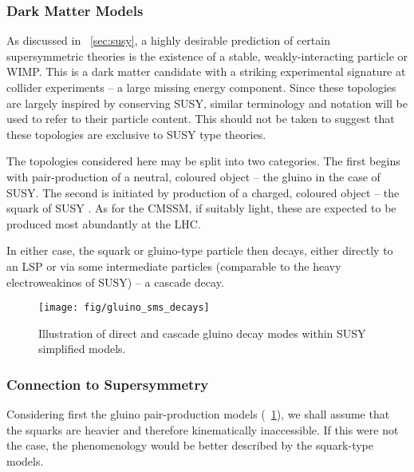 \subsubsection{Dark Matter Models}
As discussed in \chap~\ref{sec:susy}, a highly desirable prediction of certain
supersymmetric theories is the existence of a stable, weakly-interacting
particle or \ac{WIMP}. This is a dark matter candidate with a striking
experimental signature at collider experiments -- a large missing energy
component. Since these topologies are largely inspired by \Rparity conserving
\ac{SUSY}, similar terminology and notation will be used to refer to their
particle content. This should not be taken to suggest that these topologies are
exclusive to \ac{SUSY} type theories.

The topologies considered here may be split into two categories. The first
begins with pair-production of a neutral, coloured object -- the gluino in the
case of \ac{SUSY}. The second is initiated by production of a charged, coloured
object -- the squark of \ac{SUSY} . As for the \ac{CMSSM}, if suitably light,
these are expected to be produced most abundantly at the \ac{LHC}.

In either case, the squark or gluino-type particle then decays, either directly
to an \ac{LSP} or via some intermediate particles (comparable to the heavy
electroweakinos of \ac{SUSY}) -- a cascade decay.

\begin{figure}[htbp!]
\texttt{[image: fig/gluino\_sms\_decays]}
\caption[Illustration of direct and cascade decay modes within simplified
models]{Illustration of direct and cascade gluino decay modes within \ac{SUSY}
  simplified models.~\cite{alves_simplified_2011}}
\label{fig:gluino_sms_decays}
\end{figure}

\subsubsection{Connection to Supersymmetry}
Considering first the gluino pair-production models
(\fig~\ref{fig:gluino_sms_decays}), we shall assume that the squarks are heavier
and therefore kinematically inaccessible. If this were not the case, the
phenomenology would be better described by the squark-type models.

